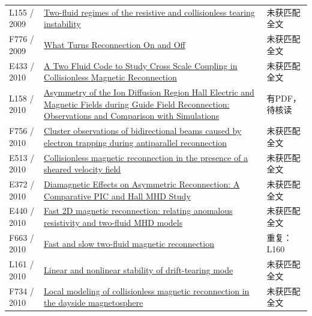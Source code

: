 \begin{longtable}{P{24mm}P{97mm}P{27mm}}
L155 / 2009 & \href{https://doi.org/10.1063/1.3068470}{Two-fluid regimes of the resistive and collisionless tearing instability} & 未获匹配全文\\

F776 / 2009 & \href{https://ntrs.nasa.gov/search.jsp?R=20090012450}{What Turns Reconnection On and Off} & 未获匹配全文\\

E433 / 2010 & \href{http://ui.adsabs.harvard.edu/abs/2010AGUFMSM51B1813J/abstract}{A Two Fluid Code to Study Cross Scale Coupling in Collisionless Magnetic Reconnection} & 未获匹配全文\\

L158 / 2010 & \href{https://doi.org/10.1103/physrevlett.104.205001}{Asymmetry of the Ion Diffusion Region Hall Electric and Magnetic Fields during Guide Field Reconnection: Observations and Comparison with Simulations} & 有PDF，待核读\\

F756 / 2010 & \href{https://doi.org/10.1029/2009ja014650}{Cluster observations of bidirectional beams caused by electron trapping during antiparallel reconnection} & 未获匹配全文\\

E513 / 2010 & \href{https://doi.org/10.1063/1.3430640}{Collisionless magnetic reconnection in the presence of a sheared velocity field} & 未获匹配全文\\

E372 / 2010 & \href{http://absimage.aps.org/image/DPP10/MWS_DPP10-2010-001669.pdf}{Diamagnetic Effects on Asymmetric Reconnection: A Comparative PIC and Hall MHD Study} & 未获匹配全文\\

E440 / 2010 & \href{http://absimage.aps.org/image/DPP10/MWS_DPP10-2010-000576.pdf}{Fast 2D magnetic reconnection: relating anomalous resistivity and two-fluid MHD models} & 未获匹配全文\\

F663 / 2010 & \href{https://doi.org/10.48550/arxiv.1005.3760}{Fast and slow two-fluid magnetic reconnection} & 重复：L160\\

L161 / 2010 & \href{https://doi.org/10.1088/0029-5515/50/2/025014}{Linear and nonlinear stability of drift-tearing mode} & 未获匹配全文\\

F734 / 2010 & \href{https://doi.org/10.1080/10420150903516569}{Local modeling of collisionless magnetic reconnection in the dayside magnetosphere} & 未获匹配全文\\


\end{longtable}

